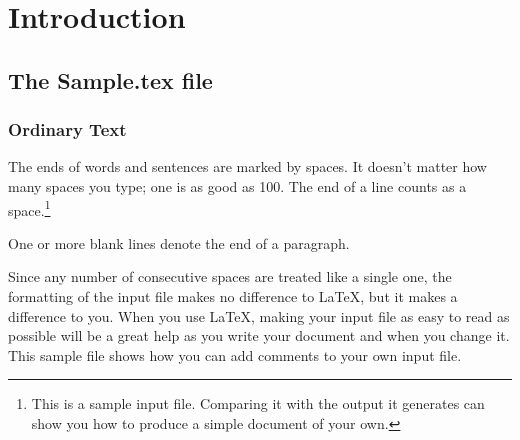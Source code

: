 %
\chapter{Introduction}\label{introduction}   %
%
%
%
%
%
%
\fixchapterheading %
\section{The Sample.tex file}  %
%


\subsection{Ordinary Text}   %

The ends of words and sentences are marked by spaces. It doesn't matter
how many spaces you type; one is as good as 100.  The end of a line
counts as a space.\footnote{
This is a sample input file.  Comparing it with the output it
generates can show you how to produce a simple document of
your own.
}

One or more blank lines denote the end of a paragraph.

Since any number of consecutive spaces are treated like a single one,
the formatting of the input file makes no difference to \LaTeX,
but it makes a difference to you. When you use
\LaTeX,       %
making your input file as easy to read as possible will be a great help
as you write your document and when you change it.  This sample file
shows how you can add comments to your own input file.

